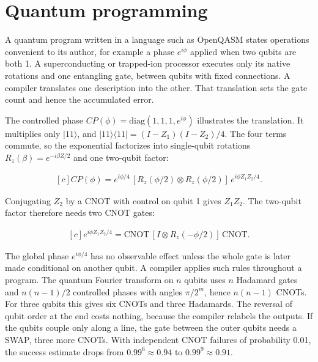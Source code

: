 \documentclass[11pt,oneside]{book}
\newenvironment{centeredalign}{\[\begin{gathered}[c]}{\end{gathered}\]}
\begin{document}
\clearpage

\section{Quantum programming}

\label{topic:quantum-programming}

A quantum program written in a language such as OpenQASM states operations convenient to its author, for example a phase \(e^{i\phi}\) applied when two qubits are both 1. A superconducting or trapped-ion processor executes only its native rotations and one entangling gate, between qubits with fixed connections. A compiler translates one description into the other. That translation sets the gate count and hence the accumulated error.

The controlled phase \(CP(\phi)=\mathrm{diag}(1,1,1,e^{i\phi})\) illustrates the translation. It multiplies only \(|11\rangle\), and \(|11\rangle\langle11|=(I-Z_1)(I-Z_2)/4\). The four terms commute, so the exponential factorizes into single-qubit rotations \(R_z(\beta)=e^{-i\beta Z/2}\) and one two-qubit factor:

\begin{centeredalign}
CP(\phi)=e^{i\phi/4}\,[R_z(\phi/2)\otimes R_z(\phi/2)]\,e^{i\phi Z_1Z_2/4}.
\end{centeredalign}

Conjugating \(Z_2\) by a CNOT with control on qubit 1 gives \(Z_1Z_2\). The two-qubit factor therefore needs two CNOT gates:

\begin{centeredalign}
e^{i\phi Z_1Z_2/4}=\mathrm{CNOT}\,[I\otimes R_z(-\phi/2)]\,\mathrm{CNOT}.
\end{centeredalign}

The global phase \(e^{i\phi/4}\) has no observable effect unless the whole gate is later made conditional on another qubit. A compiler applies such rules throughout a program. The quantum Fourier transform on \(n\) qubits uses \(n\) Hadamard gates and \(n(n-1)/2\) controlled phases with angles \(\pi/2^m\), hence \(n(n-1)\) CNOTs. For three qubits this gives six CNOTs and three Hadamards. The reversal of qubit order at the end costs nothing, because the compiler relabels the outputs. If the qubits couple only along a line, the gate between the outer qubits needs a SWAP, three more CNOTs. With independent CNOT failures of probability 0.01, the success estimate drops from \(0.99^6\approx0.94\) to \(0.99^9\approx0.91\).
\end{document}
